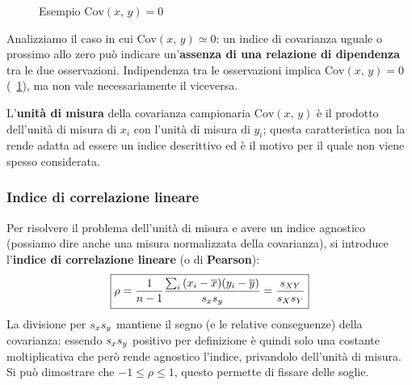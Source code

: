 \setlength\intextsep{0pt}
\begin{figure}
\caption{Esempio $\text{Cov}(x, \, y) = 0$}
\label{fig:scatter_norelation}
\end{figure}

\noindent Analizziamo il caso in cui $\text{Cov}(x, \, y) \simeq 0$: un indice di covarianza uguale o prossimo allo zero può indicare un'\textbf{assenza di una relazione di dipendenza} tra le due osservazioni. Indipendenza tra le osservazioni implica $\text{Cov}(x, \, y) = 0$ (\figurename \  \ref{fig:scatter_norelation}), ma non vale necessariamente il viceversa.

\noindent L'\textbf{unità di misura} della covarianza campionaria $\text{Cov}(x, \, y)$ è il prodotto dell'unità di misura di $x_i$ con l'unità di misura di $y_i$; questa caratteristica non la rende adatta ad essere un indice descrittivo ed è il motivo per il quale non viene spesso considerata.

\label{sd:indice-correlazione-lineare}
\subsubsection{Indice di correlazione lineare}
Per risolvere il problema dell'unità di misura e avere un indice agnostico (possiamo dire anche una misura normalizzata della covarianza), si introduce l'\textbf{indice di correlazione lineare} (o di \textbf{Pearson}):
\[
\boxed{
\rho = \frac{1}{n-1} \frac{\sum_i{(x_i - \overline{x})(y_i - \overline{y})}}{\mathnormal{s}_x \mathnormal{s}_y} = \frac{\mathnormal{s}_{XY}}{\mathnormal{s}_X \mathnormal{s}_Y}
}
\]
\newline La divisione per $\mathnormal{s}_x \mathnormal{s}_y$ mantiene il segno (e le relative conseguenze) della covarianza: essendo $\mathnormal{s}_x \mathnormal{s}_y$ positivo per definizione è quindi solo una costante moltiplicativa che però rende agnostico l'indice, privandolo dell'unità di misura. Si può dimostrare che $\boxed{-1 \le \rho \le 1}$, questo permette di fissare delle soglie.

